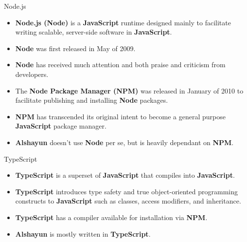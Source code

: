 \documentclass{beamer}
\begin{document}
\begin{frame}{Node.js}
    \begin{itemize}
        \item \textbf{Node.js (Node)} is a \textbf{JavaScript} runtime designed
            mainly to facilitate writing scalable, server-side software in
            \textbf{JavaScript}.
        \item \textbf{Node} was first released in May of 2009.
        \item \textbf{Node} has received much attention and both praise and
            criticism from developers.
        \item The \textbf{Node Package Manager (NPM)} was released in January of
            2010 to facilitate publishing and installing \textbf{Node} packages.
        \item \textbf{NPM} has transcended its original intent to become a
            general purpose \textbf{JavaScript} package manager.
        \item \textbf{Alshayun} doesn't use \textbf{Node} per se, but is heavily
            dependant on \textbf{NPM}.
    \end{itemize}
\end{frame}

\begin{frame}{TypeScript}
    \begin{itemize}
        \item \textbf{TypeScript} is a superset of \textbf{JavaScript} that
            compiles into \textbf{JavaScript}.
        \item \textbf{TypeScript} introduces type safety and true
            object-oriented programming constructs to \textbf{JavaScript} such
            as classes, access modifiers, and inheritance.
        \item \textbf{TypeScript} has a compiler available for installation via
            \textbf{NPM}.
        \item \textbf{Alshayun} is mostly written in \textbf{TypeScript}.
    \end{itemize}
\end{frame}
\end{document}
